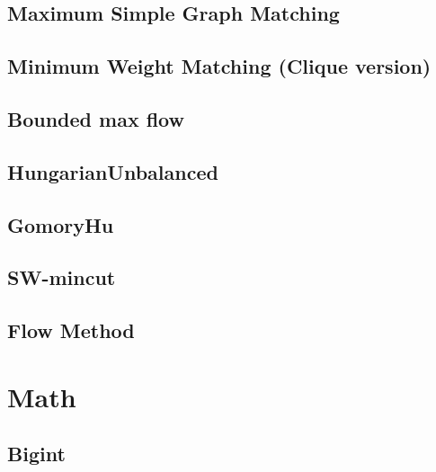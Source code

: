 \documentclass[a4paper,10pt,twocolumn,oneside]{article}
\begin{document}
\subsection{Maximum Simple Graph Matching}


\subsection{Minimum Weight Matching (Clique version)}


% 

\subsection{Bounded max flow}


\subsection{HungarianUnbalanced}


\subsection{GomoryHu}


\subsection{SW-mincut}


\subsection{Flow Method}


\section{Math}

\subsection{Bigint}

\end{document}

